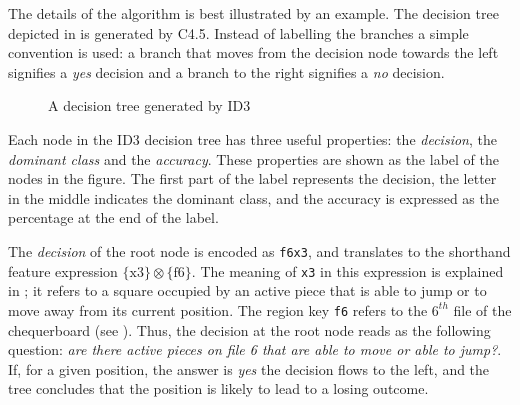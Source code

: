 The details of the algorithm is best illustrated by an example.  The decision tree depicted in  is generated by C4.5. Instead of labelling the branches a simple convention is used: a branch that moves from the decision node towards the left signifies a {\sl yes} decision and a branch to the right signifies a {\sl no} decision. 
\begin{figure} [htb]
\center
\tiny
{}
{
		{
				{
						{
								{
										{
												{
														{
																{
																		{
																				{
																						{
																						}
																				}
																		}
																}
														}
												}
										}
								}
						}
				}
		}
}
\caption{A decision tree generated by ID3}
\label{fig:dec_tree}
\end{figure}
Each node in the ID3 decision tree has three useful properties: the {\sl decision}, the {\sl dominant class} and the {\sl accuracy}.  These properties are shown as the label of the nodes in the figure.  The first part of the label represents the decision, the letter in the middle indicates the dominant class, and the accuracy is expressed as the percentage at the end of the label. 

The {\sl decision} of the root node is encoded as {\tt f6x3}, and translates to the shorthand feature expression 
$\{\mbox{x3}\} \otimes \{\mbox{f6}\}$. 
The meaning of {\tt x3} in this expression is explained in ;  it refers to a square occupied by an active piece that is able to jump or to move away from its current position. The region key {\tt f6} refers to the  $6^{th}$ file of the chequerboard (see ). Thus, the decision at the root node reads as the following question: {\it are there active pieces on file 6 that are able to move or able to jump?}.  If, for a given position, the answer is {\it yes} the decision flows to the left, and the tree concludes that the position is likely to lead to a losing outcome.  

